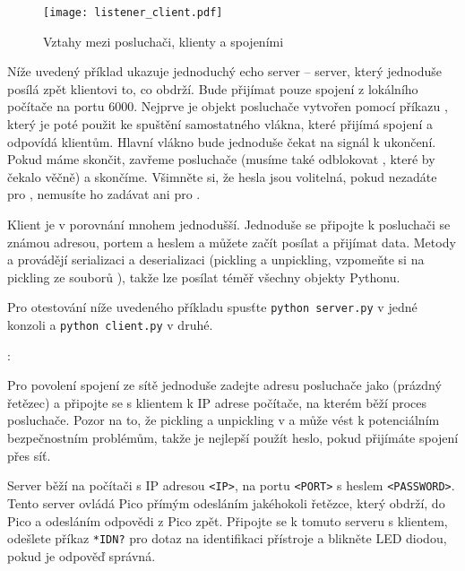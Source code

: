 \begin{figure}
    \label{fig:listener-client}
    \texttt{[image: listener\_client.pdf]}
    \caption{Vztahy mezi posluchači, klienty a spojeními}
\end{figure}

Níže uvedený příklad ukazuje jednoduchý echo server -- server, který jednoduše posílá zpět klientovi to, co obdrží. Bude přijímat pouze spojení z lokálního počítače na portu 6000. Nejprve je objekt posluchače vytvořen pomocí příkazu , který je poté použit ke spuštění samostatného vlákna, které přijímá spojení a odpovídá klientům. Hlavní vlákno bude jednoduše čekat na signál k ukončení. Pokud máme skončit, zavřeme posluchače (musíme také odblokovat , které by čekalo věčně) a skončíme. Všimněte si, že hesla jsou volitelná, pokud nezadáte  pro , nemusíte ho zadávat ani pro .

Klient je v porovnání mnohem jednodušší. Jednoduše se připojte k posluchači se známou adresou, portem a heslem a můžete začít posílat a přijímat data. Metody  a  provádějí serializaci a deserializaci (pickling a unpickling, vzpomeňte si na pickling ze souborů ), takže lze posílat téměř všechny objekty Pythonu.

Pro otestování níže uvedeného příkladu spusťte \verb|python server.py| v jedné konzoli a \verb|python client.py| v druhé.

:




Pro povolení spojení ze sítě jednoduše zadejte adresu posluchače jako  (prázdný řetězec) a připojte se s klientem k IP adrese počítače, na kterém běží proces posluchače. Pozor na to, že pickling a unpickling v  a  může vést k potenciálním bezpečnostním problémům, takže je nejlepší použít heslo, pokud přijímáte spojení přes síť.

\begin{exercise}
Server běží na počítači s IP adresou \verb|<IP>|, na portu \verb|<PORT>| s heslem \verb|<PASSWORD>|. Tento server ovládá Pico přímým odesláním jakéhokoli řetězce, který obdrží, do Pico a odesláním odpovědi z Pico zpět. Připojte se k tomuto serveru s klientem, odešlete příkaz \verb|*IDN?| pro dotaz na identifikaci přístroje a blikněte LED diodou, pokud je odpověď správná.
\end{exercise}

